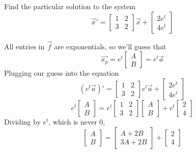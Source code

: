 \begin{example}
	Find the particular solution to the system
	\begin{equation*}
		\vec{x}' = \begin{bmatrix}
			1 & 2 \\
			3 & 2
		\end{bmatrix}\vec{x} + \begin{bmatrix}
			2e^t \\
			4e^t
		\end{bmatrix}
	\end{equation*}
\end{example}
\noindent
All entries in $\vec{f}$ are exponentials, so we'll guess that
\begin{equation*}
	\vec{x_p} = e^t\begin{bmatrix}
		A \\
		B
	\end{bmatrix} = e^t\vec{a}
\end{equation*}
Plugging our guess into the equation
\begin{equation*}
	\left(e^t\vec{a}\right)' = \begin{bmatrix}
		1 & 2 \\
		3 & 2
	\end{bmatrix}e^t\vec{a} + \begin{bmatrix}
		2e^t \\
		4e^t
	\end{bmatrix}
\end{equation*}
\begin{equation*}
	e^t\begin{bmatrix}
		A \\
		B
	\end{bmatrix} = e^t\begin{bmatrix}
		1 & 2 \\
		3 & 2
	\end{bmatrix}\begin{bmatrix}
		A \\ 
		B
	\end{bmatrix} + e^t\begin{bmatrix}
		2 \\
		4
	\end{bmatrix}
\end{equation*}
Dividing by $e^t$, which is never 0,
\begin{equation*}
	\begin{bmatrix}
		A \\
		B
	\end{bmatrix} = \begin{bmatrix}
		A + 2B \\
		3A + 2B 
	\end{bmatrix} + \begin{bmatrix}
		2 \\
		4
	\end{bmatrix}
\end{equation*}

